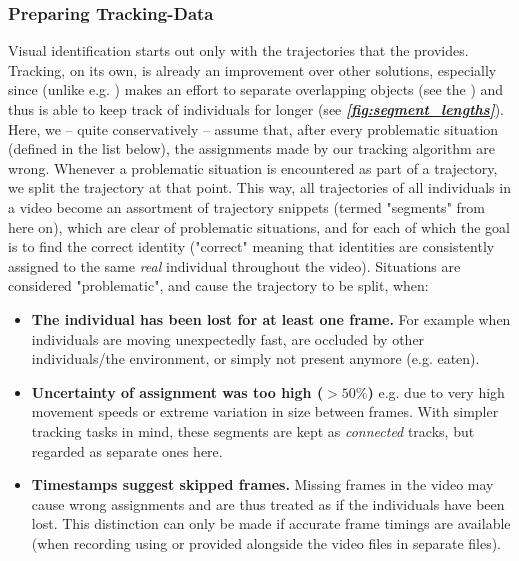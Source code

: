 \documentclass[9pt,lineno]{elife}
\newcommand{\figref}[1]{\textit{\textbf{\ref{#1}}}}
\newcommand{\idtracker}{\protect\path{ idtracker.ai}}
\newcommand{\TRex}{\protect\path{TRex}}
\newcommand{\TGrabs}{\protect\path{TGrabs}}
\begin{document}
\subsubsection{Preparing Tracking-Data} \label{sec:segments}

Visual identification starts out only with the trajectories that the  provides.
Tracking, on its own, is already an improvement over other solutions, especially since (unlike e.g. \idtracker{}) \TRex{} makes an effort to separate overlapping objects (see the ) and thus is able to keep track of individuals for longer (see \figref{fig:segment_lengths}). Here, we -- quite conservatively -- assume that, after every problematic situation (defined in the list below), the assignments made by our tracking algorithm are wrong. Whenever a problematic situation is encountered as part of a trajectory, we split the trajectory at that point. This way, all trajectories of all individuals in a video become an assortment of trajectory snippets (termed "segments" from here on), which are clear of problematic situations, and for each of which the goal is to find the correct identity ("correct" meaning that identities are consistently assigned to the same \textit{real} individual throughout the video). Situations are considered "problematic", and cause the trajectory to be split, when:



\begin{itemize}[label=\textnormal{$\bullet$}]
	\item \textbf{The individual has been lost for at least one frame.} For example when individuals are moving unexpectedly fast, are occluded by other individuals/the environment, or simply not present anymore (e.g. eaten).
	\item \textbf{Uncertainty of assignment was too high ($>50\%$)} e.g. due to very high movement speeds or extreme variation in size between frames. With simpler tracking tasks in mind, these segments are kept as \emph{connected} tracks, but regarded as separate ones here.
	\item \textbf{Timestamps suggest skipped frames.} Missing frames in the video may cause wrong assignments and are thus treated as if the individuals have been lost. This distinction can only be made if accurate frame timings are available (when recording using \TGrabs{} or provided alongside the video files in separate \protect{} files).
\end{itemize}
\end{document}
